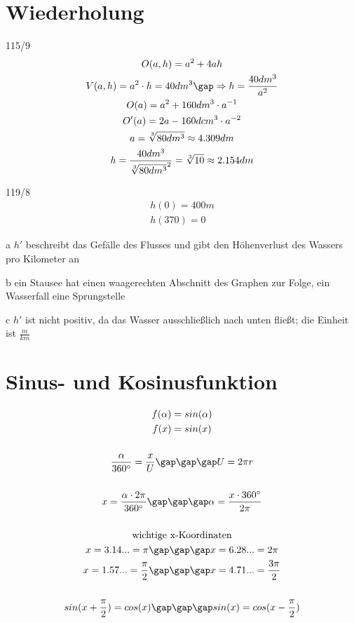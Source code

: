 \section{Wiederholung}
\begin{exercise}{115/9}
  \begin{gather*}
    O(a, h) = a^2 + 4ah \\
    V(a, h) = a^2 \cdot h = 40dm^3 \gap\Rightarrow h = \frac{40dm^3}{a^2} \\
    O(a) = a^2 + 160dm^3 \cdot a^{-1} \\
    O'(a) = 2a - 160dcm^3 \cdot a^{-2} \\
    a = \sqrt[3]{80dm^3} \approx 4.309dm \\
    h = \frac{40dm^3}{\sqrt[3]{80dm^3}^2} = \sqrt[3]{10} \approx 2.154dm
  \end{gather*}
\end{exercise}
\begin{exercise}{119/8}
  \begin{gather*}
    h(0) = 400m \\
    h(370) = 0
  \end{gather*}
  \item [a]
  $h'$ beschreibt das Gefälle des Flusses und gibt den Höhenverlust des Wassers pro Kilometer an
  \item [b]
  ein Stausee hat einen waagerechten Abschnitt des Graphen zur Folge, ein Wasserfall eine Sprungstelle
  \item [c]
  $h'$ ist nicht positiv, da das Wasser ausschließlich nach unten fließt; die Einheit ist $\frac{m}{km}$
\end{exercise}
\section{Sinus- und Kosinusfunktion}
\begin{gather*}
  f(\alpha) = sin(\alpha) \\
  f(x) = sin(x) \\\\
  \frac{\alpha}{360^\circ} = \frac{x}{U} \gap\gap\gap U = 2\pi r \\\\
  x = \frac{\alpha \cdot 2\pi}{360^\circ} \gap\gap\gap \alpha = \frac{x \cdot 360^\circ}{2\pi} \\\\
  \text{wichtige x-Koordinaten} \\
  x = 3.14... = \pi \gap\gap\gap x = 6.28... = 2\pi \\
  x = 1.57... = \frac{\pi}{2} \gap\gap\gap x = 4.71... = \frac{3\pi}{2} \\\\
  sin(x + \frac{\pi}{2}) = cos(x) \gap\gap\gap sin(x) = cos(x - \frac{\pi}{2}) \\\\
\end{gather*}
